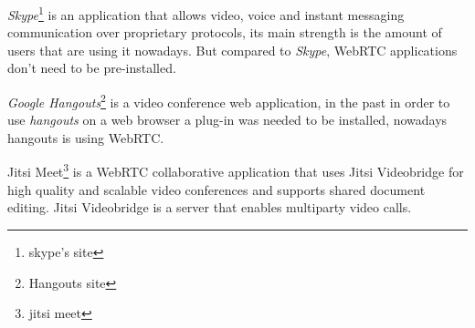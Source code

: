 \textit{Skype}\footnote{skype's site} is an application that allows video, voice and instant messaging communication over proprietary protocols, its main strength is the amount of users that are using it nowadays. But compared to \textit{Skype}, \ac{WebRTC} applications don't need to be pre-installed.

\textit{Google Hangouts}\footnote{Hangouts site} is a video conference web application, in the past in order to use \textit{hangouts} on a web browser a plug-in was needed to be installed, nowadays hangouts is using \ac{WebRTC}.

Jitsi Meet\footnote{jitsi meet} is a \ac{WebRTC} collaborative application that uses Jitsi Videobridge for high quality and scalable video conferences and supports shared document editing. Jitsi Videobridge is a server that enables multiparty video calls.




